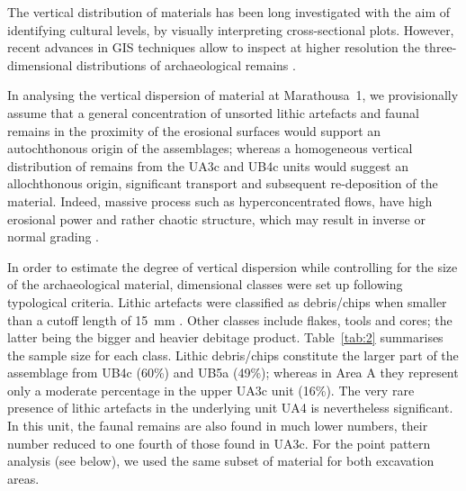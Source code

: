 \documentclass[preprint,authoryear,times]{elsarticle} %
\begin{document}
The vertical distribution of materials has been long investigated with the aim of identifying cultural levels, by visually interpreting cross-sectional plots. However, recent advances in GIS techniques allow to inspect at higher resolution the three-dimensional distributions of archaeological remains \citep[][among others]{McPherron2005a,Anderson2008}.

In analysing the vertical dispersion of material at Marathousa~1, we provisionally assume that a general concentration of unsorted lithic artefacts and faunal remains in the proximity of the erosional surfaces would support an autochthonous origin of the assemblages; whereas a homogeneous vertical distribution of remains from the UA3c and UB4c units would suggest an allochthonous origin, significant transport and subsequent re-deposition of the material. Indeed, massive process such as hyperconcentrated flows, have high erosional power and rather chaotic structure, which may result in inverse or normal grading \citep{Benvenuti2002}.

In order to estimate the degree of vertical dispersion while controlling for the size of the archaeological material, dimensional classes were set up following typological criteria. Lithic artefacts were classified as debris/chips when smaller than a cutoff length of 15~mm \citep{Tourloukis}. Other classes include flakes, tools and cores; the latter being the bigger and heavier debitage product. Table~\ref{tab:2} summarises the sample size for each class. Lithic debris/chips constitute the larger part of the assemblage from UB4c (60\%) and UB5a (49\%); whereas in Area A they represent only a moderate percentage in the upper UA3c unit (16\%). The very rare presence of lithic artefacts in the underlying unit UA4 is nevertheless significant. In this unit, the faunal remains are also found in much lower numbers, their number reduced to one fourth of those found in UA3c. For the point pattern analysis (see below), we used the same subset of material for both excavation areas.
\end{document}

